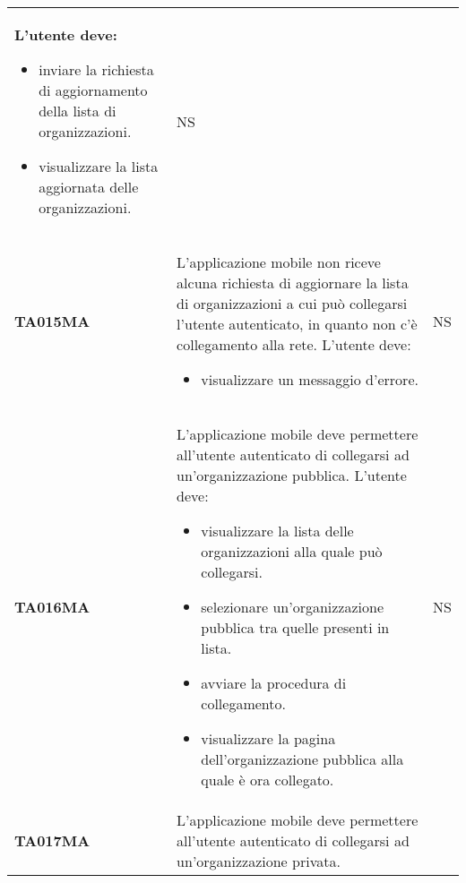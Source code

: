 \documentclass[../../piano-di-qualifica.tex]{subfiles}
\begin{document}
\begin{longtable}[H]{>{\centering\bfseries}m{3cm} >{}m{10cm} >{\centering\arraybackslash}m{3cm}}
  L'utente deve:
  \begin{itemize}
    \item inviare la richiesta di aggiornamento della lista di organizzazioni.
    \item visualizzare la lista aggiornata delle organizzazioni.
  \end{itemize}
                    & NS                                                                                                                                                                                                                                                               \\
  TA015MA           & L'applicazione mobile non riceve alcuna richiesta di aggiornare la lista di organizzazioni a cui può collegarsi l'utente autenticato, in quanto non c'è collegamento alla rete. \newline
  L'utente deve:
  \begin{itemize}
    \item visualizzare un messaggio d'errore.
  \end{itemize}
                    & NS                                                                                                                                                                                                                                                               \\
  TA016MA           & L'applicazione mobile deve permettere all'utente autenticato di collegarsi ad un'organizzazione pubblica. \newline
  L'utente deve:
  \begin{itemize}
    \item visualizzare la lista delle organizzazioni alla quale può collegarsi.
    \item selezionare un'organizzazione pubblica tra quelle presenti in lista.
    \item avviare la procedura di collegamento.
    \item visualizzare la pagina dell'organizzazione pubblica alla quale è ora collegato.
  \end{itemize}
                    & NS                                                                                                                                                                                                                                                               \\
  TA017MA           & L'applicazione mobile deve permettere all'utente autenticato di collegarsi ad un'organizzazione privata. \newline

\end{longtable}
\end{document}
